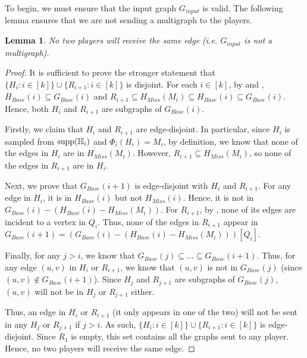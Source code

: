 \documentclass[11pt]{article}
\newtheorem{lemma}{Lemma}[section]
\theoremstyle{definition}
\newcommand{\supp}[1]{\ensuremath{\textnormal{\text{supp}}(#1)}}
\begin{document}
To begin, we must ensure that the input graph $G_{input}$ is valid. The following lemma ensures that we are not sending a multigraph to the players. 

\begin{lemma}\label{graph-is-not-multi}
    No two players will receive the same edge (i.e. $G_{input}$ is not a multigraph).
\end{lemma}
\begin{proof}
It is sufficient to prove the stronger statement that $\{H_i:i\in[k]\}\cup \{R_{i+1}:i\in[k]\}$ is disjoint. For each $i\in [k]$, by  and , $H_{Base}(i)\subseteq G_{Base}(i)$ and $R_{i+1}\subseteq H_{Miss}(M_i)\subseteq H_{Base}(i)\subseteq G_{Base}(i)$. Hence, both $H_i$ and $R_{i+1}$ are subgraphs of $G_{Base}(i)$. 

Firstly, we claim that $H_i$ and $R_{i+1}$ are edge-disjoint. In particular, since $H_i$ is sampled from $\supp{\mathbb{H}_i}$ and $\Phi_i(H_i)=M_i$, by definition, we know that none of the edges in $H_i$ are in $H_{Miss}(M_i)$. However, $R_{i+1}\subseteq H_{Miss}(M_i)$, so none of the edges in $R_{i+1}$ are in $H_i$.

Next, we prove that $G_{Base}(i+1)$ is edge-disjoint with $H_i$ and $R_{i+1}$. For any edge in $H_i$, it is in $H_{Base}(i)$ but not $H_{Miss}(i)$. Hence, it is not in $G_{Base}(i)-(H_{Base}(i)-H_{Miss}(M_i))$. For $R_{i+1}$, by , none of its edges are incident to a vertex in $Q_i$. Thus, none of the edges in $R_{i+1}$ appear in $G_{Base}(i+1)=(G_{Base}(i)-(H_{Base}(i)-H_{Miss}(M_i)))[Q_i]$.

Finally, for any $j>i$, we know that $G_{Base}(j)\subseteq \dots\subseteq G_{Base}(i+1)$. Thus, for any edge $(u, v)$ in $H_i$ or $R_{i+1}$, we know that $(u, v)$ is not in $G_{Base}(j)$ (since $(u, v)\not\in G_{Base}(i+1)$). Since $H_j$ and $R_{j+1}$ are subgraphs of $G_{Base}(j)$, $(u, v)$ will not be in $H_j$ or $R_{j+1}$ either. 

Thus, an edge in $H_i$ or $R_{i+1}$ (it only appears in one of the two) will not be sent in any $H_j$ or $R_{j+1}$ if $j>i$. As such, $\{H_i:i\in[k]\}\cup \{R_{i+1}:i\in[k]\}$ is edge-disjoint. Since $R_1$ is empty, this set contains all the graphs sent to any player. Hence, no two players will receive the same edge.
\end{proof}
\end{document}
